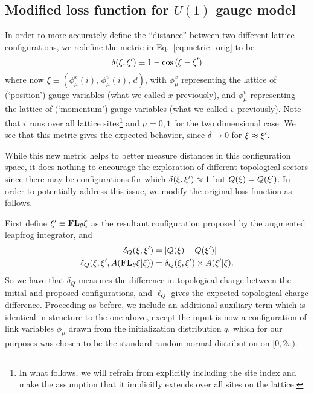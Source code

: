 \documentclass[main.tex]{subfiles}
\begin{document}
\subsection{Modified loss function for \texorpdfstring{$U(1)$}{U (1)} gauge model}
\label{subsec:l2hmc_modifiedloss}
%
In order to more accurately define the ``distance'' between two different lattice configurations, we redefine the
metric in Eq.~\ref{eq:metric_orig} to be
%
\begin{equation}
  \delta(\xi, {\xi^{\prime}}) \equiv 1 - \cos\left(\xi - \xi^{\prime}\right)
  \label{eq:metric_new}
\end{equation}
%
where now $\xi \equiv {\left(\phi_{\mu}^{x}(i), \,\phi_{\mu}^{v}(i),\, d\right)}$, with $\phi_{\mu}^{x}$ representing
the lattice of (`position') gauge variables (what we called $x$ previously), and $\phi_{\mu}^{v}$ representing the
lattice of (`momentum') gauge variables (what we called $v$ previously). Note that $i$ runs over all lattice
sites\footnote{In what follows, we will refrain from explicitly including the site index and make the assumption that
it implicitly extends over all sites on the lattice.} and  $\mu=0, 1$ for the two dimensional case.
%
We see that this metric gives the expected behavior, since $\delta \rightarrow 0$ for $\xi \approx {\xi^{\prime}}$.

While this new metric helps to better measure distances in this configuration space, it does nothing to encourage the
exploration of different topological sectors since there may be configurations for which $\delta(\xi, {\xi^{\prime}}) \approx 1$
but $Q(\xi) = Q({\xi^{\prime}})$.
%
In order to potentially address this issue, we modify the original loss function as follows.


First define ${\xi^{\prime}}\equiv {\mathbf{FL}_{\theta}} \xi$ as the resultant configuration proposed by the augmented leapfrog integrator, and
%
\begin{align}
  \delta_{Q}{(\xi, \xi^{\prime})} &= \left|Q{(\xi)} - Q{(\xi^{\prime})}\right| \\
  \ell_{Q}{\left(\xi, {\xi^{\prime}}, A{({\mathbf{FL}_{\theta}}\xi|\xi)}\right)} &= \delta_{Q}{(\xi,{\xi^{\prime}})}
    \times A{({\xi^{\prime}}|\xi)}.
\end{align}
%
So we have that $\delta_{Q}$ measures the difference in topological charge between the initial and proposed
configurations, and $\ell_{Q}$ gives the expected topological charge difference.
%
Proceeding as before, we include an additional auxiliary term which is identical in structure to the one above, except
the input is now a configuration of link variables $\phi_{\mu}$ drawn from the initialization distribution $q$, which
for our purposes was chosen to be the standard random normal distribution on $[0, 2\pi)$. %
\end{document}
